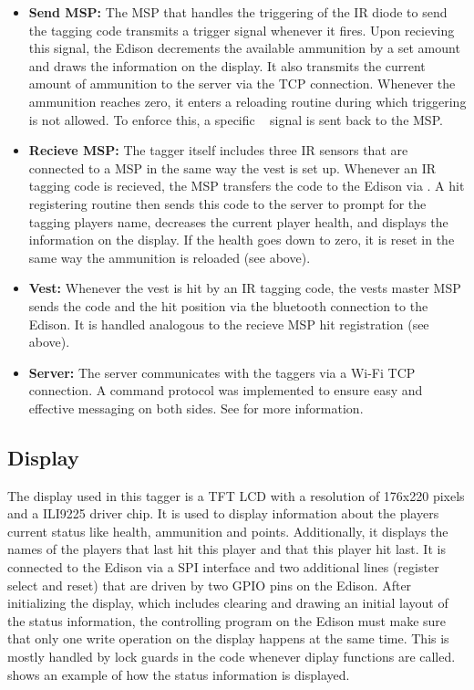 \begin{itemize}
	\item \textbf{Send MSP:} The MSP that handles the triggering of the IR diode to send the tagging code transmits a 
	trigger signal whenever it fires. Upon recieving this signal, the Edison decrements the available ammunition by a set 
	amount and draws the information on the display. It also transmits the current amount of ammunition to the server via 
	the TCP connection. Whenever the ammunition reaches zero, it enters a reloading routine during which triggering is not 
	allowed. To enforce this, a specific \isqc~ signal is sent back to the MSP.
	\item \textbf{Recieve MSP:} The tagger itself includes three IR sensors that are connected to a MSP in the same way 
	the vest is set up. Whenever an IR tagging code is recieved, the MSP transfers the code to the Edison via \isqc. A 
	hit registering routine then sends this code to the server to prompt for the tagging players name, decreases the 
	current player health, and displays the information on the display. If the health goes down to zero, it is reset in 
	the same way the ammunition is reloaded (see above).
	\item \textbf{Vest:} Whenever the vest is hit by an IR tagging code, the vests master MSP sends the code and the hit 
	position via the bluetooth connection to the Edison. It is handled analogous to the recieve MSP hit registration (see 
	above).
	\item \textbf{Server:} The server communicates with the taggers via a Wi-Fi TCP connection. A command protocol was 
	implemented to ensure easy and effective messaging on both sides. See  for 
	more information.
\end{itemize}

\subsection{Display}
The display used in this tagger is a  TFT LCD with a resolution of 176x220 pixels and a ILI9225 driver 
chip. It is used to display information about the players current status like health, ammunition and points. 
Additionally, it displays the names of the players that last hit this player and that this player hit last. It is connected to the Edison via a SPI interface and two additional lines (register select and reset) that 
are driven by two GPIO pins on the Edison. After initializing the display, which includes clearing and drawing an 
initial layout of the status information, the controlling program on the Edison must make sure that only one write 
operation on the display happens at the same time. This is mostly handled by lock guards in the code whenever diplay 
functions are called.  shows an example of how the status information is displayed.

